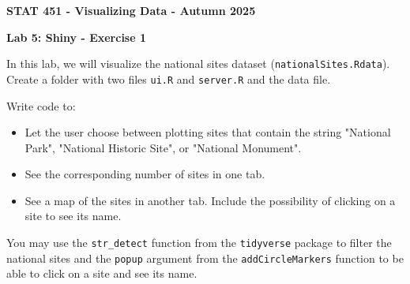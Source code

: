 \documentclass[letterpaper, 12pt]{article}
\begin{document}
\begin{center}
\textbf{\Large{STAT 451 - Visualizing Data - Autumn 2025}}
\end{center}

\vspace{2em}

\textbf{\large{Lab 5: Shiny - Exercise 1}}

\vspace{2em}

In this lab, we will visualize the national sites dataset (\verb|nationalSites.Rdata|). Create a folder with two files \verb|ui.R| and \verb|server.R| and the data file.

\vspace{1em}

Write code to:
\begin{itemize}
	\item Let the user choose between plotting sites that contain the string "National Park", "National Historic Site", or "National Monument".
	\item See the corresponding number of sites in one tab.
	\item See a map of the sites in another tab. Include the possibility of clicking on a site to see its name.
\end{itemize}

\vspace{1em}

You may use the \verb|str_detect| function from the \verb|tidyverse| package to filter the national sites and the \verb|popup| argument from the \verb|addCircleMarkers| function to be able to click on a site and see its name.
 
\end{document}
